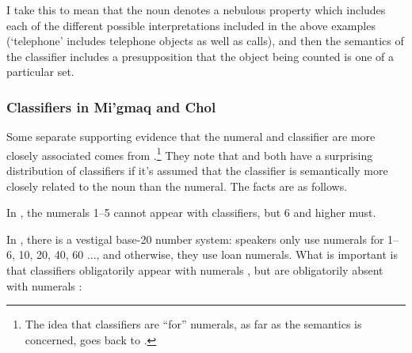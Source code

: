 \documentclass[output=paper
,modfonts
,nonflat]{langsci/langscibook}
\begin{document}
I take this to mean that the noun denotes a nebulous property which includes each of the different possible interpretations included in the above examples (`telephone' includes telephone objects as well as calls), and then the semantics of the classifier includes a presupposition that the object being counted is one of a particular set. 

\subsubsection{Classifiers in Mi'gmaq and Chol}

Some separate supporting evidence that the numeral and classifier are more closely associated comes from \citet{BaleCoon2014}.\footnote{The idea that classifiers are ``for'' numerals, as far as the semantics is concerned, goes back to \citet{Krifka1995}.} They note that  and  both have a surprising distribution of classifiers if it's assumed that the classifier is semantically more closely related to the noun than the numeral. The facts are as follows.

In , the numerals 1--5 cannot appear with classifiers, but 6 and higher must. 

	\ea
		
		\z
	\z
	
	\ea
		
		\z
	\z 


In , there is a vestigal  base-20 number system: speakers only use  numerals for 1--6, 10, 20, 40, 60 ..., and otherwise, they use  loan numerals. What is important is that classifiers obligatorily appear with  numerals , but are obligatorily absent with  numerals :\\
\end{document}
